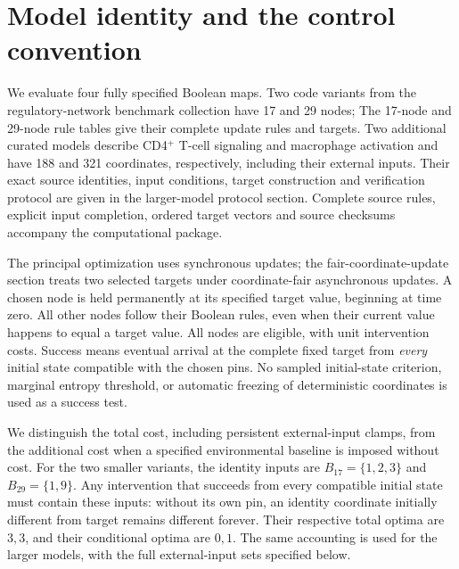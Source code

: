 
\section{Model identity and the control convention}
\label{bio:model-convention}
We evaluate four fully specified Boolean maps. Two code variants from the
regulatory-network benchmark collection have 17 and 29 nodes;
The 17-node and 29-node rule tables give their complete update
rules and targets. Two additional curated models describe CD4$^+$ T-cell
signaling and macrophage activation and have 188 and 321 coordinates,
respectively, including their external inputs. Their exact source identities,
input conditions, target construction and verification protocol are given
in the larger-model protocol section. Complete source rules, explicit input completion, ordered target
vectors and source checksums accompany the computational package.

The principal optimization uses synchronous updates; the fair-coordinate-update section treats two selected targets under coordinate-fair asynchronous updates. A chosen node is held permanently at its
specified target value, beginning at time zero. All other nodes follow
their Boolean rules, even when their current value happens to equal a
target value. All nodes are eligible, with unit intervention costs.
Success means eventual arrival at the complete fixed target from
\emph{every} initial state compatible with the chosen pins. No sampled
initial-state criterion, marginal entropy threshold, or automatic
freezing of deterministic coordinates is used as a success test.

We distinguish the total cost, including persistent external-input clamps,
from the additional cost when a specified environmental baseline is imposed
without cost. For the two smaller variants, the identity inputs are
$B_{17}=\{1,2,3\}$ and $B_{29}=\{1,9\}$. Any intervention that succeeds
from every compatible initial state must contain these inputs: without
its own pin, an identity coordinate initially different from target remains
different forever. Their respective total optima are $3,3$, and their
conditional optima are $0,1$. The same accounting is used for the larger
models, with the full external-input sets specified below.

